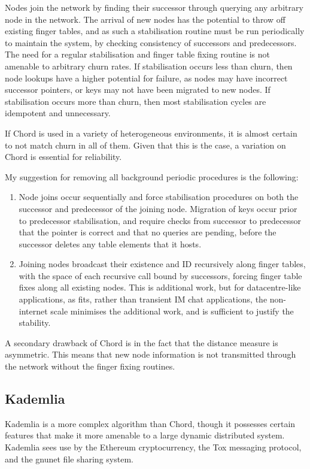 Nodes join the network by finding their successor through querying any arbitrary node in the network.
The arrival of new nodes has the potential to throw off existing finger tables, and as such a stabilisation routine must be run periodically to maintain the system, by checking consistency of successors and predecessors.
The need for a regular stabilisation and finger table fixing routine is not amenable to arbitrary churn rates.
If stabilisation occurs less than churn, then node lookups have a higher potential for failure, as nodes may have incorrect successor pointers, or keys may not have been migrated to new nodes.
If stabilisation occurs more than churn, then most stabilisation cycles are idempotent and unnecessary.

If Chord is used in a variety of heterogeneous environments, it is almost certain to not match churn in all of them.
Given that this is the case, a variation on Chord is essential for reliability.

My suggestion for removing all background periodic procedures is the following:
\begin{enumerate}
	\item Node joins occur sequentially and force stabilisation procedures on both the successor and predecessor of the joining node.
		Migration of keys occur prior to predecessor stabilisation, and require checks from successor to predecessor that the pointer is correct and that no queries are pending, before the successor deletes any table elements that it hosts.
	\item Joining nodes broadcast their existence and ID recursively along finger tables, with the space of each recursive call bound by successors, forcing finger table fixes along all existing nodes.
		This is additional work, but for datacentre-like applications, as \lsr{} fits, rather than transient IM chat applications, the non-internet scale minimises the additional work, and is sufficient to justify the stability.
\end{enumerate}

A secondary drawback of Chord is in the fact that the distance measure is asymmetric.
This means that new node information is not transmitted through the network without the finger fixing routines.

\subsection{Kademlia}

Kademlia is a more complex algorithm than Chord, though it possesses certain features that make it more amenable to a large dynamic distributed system\cite{maymounkov2002kademlia}.
Kademlia sees use by the Ethereum cryptocurrency, the Tox messaging protocol, and the gnunet file sharing system\cite{buterin2014ethereum}\cite{alkhulaiwi2016tox}\cite{wachs2014gnunet}.

